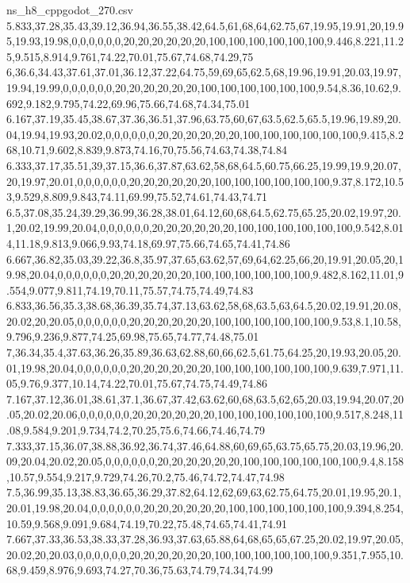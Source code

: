 \begin{filecontents*}[overwrite]{ns_h8_cppgodot_270.csv}
5.833,37.28,35.43,39.12,36.94,36.55,38.42,64.5,61,68,64,62.75,67,19.95,19.91,20,19.95,19.93,19.98,0,0,0,0,0,0,20,20,20,20,20,20,100,100,100,100,100,100,9.446,8.221,11.25,9.515,8.914,9.761,74.22,70.01,75.67,74.68,74.29,75
6,36.6,34.43,37.61,37.01,36.12,37.22,64.75,59,69,65,62.5,68,19.96,19.91,20.03,19.97,19.94,19.99,0,0,0,0,0,0,20,20,20,20,20,20,100,100,100,100,100,100,9.54,8.36,10.62,9.692,9.182,9.795,74.22,69.96,75.66,74.68,74.34,75.01
6.167,37.19,35.45,38.67,37.36,36.51,37.96,63.75,60,67,63.5,62.5,65.5,19.96,19.89,20.04,19.94,19.93,20.02,0,0,0,0,0,0,20,20,20,20,20,20,100,100,100,100,100,100,9.415,8.268,10.71,9.602,8.839,9.873,74.16,70,75.56,74.63,74.38,74.84
6.333,37.17,35.51,39,37.15,36.6,37.87,63.62,58,68,64.5,60.75,66.25,19.99,19.9,20.07,20,19.97,20.01,0,0,0,0,0,0,20,20,20,20,20,20,100,100,100,100,100,100,9.37,8.172,10.53,9.529,8.809,9.843,74.11,69.99,75.52,74.61,74.43,74.71
6.5,37.08,35.24,39.29,36.99,36.28,38.01,64.12,60,68,64.5,62.75,65.25,20.02,19.97,20.1,20.02,19.99,20.04,0,0,0,0,0,0,20,20,20,20,20,20,100,100,100,100,100,100,9.542,8.014,11.18,9.813,9.066,9.93,74.18,69.97,75.66,74.65,74.41,74.86
6.667,36.82,35.03,39.22,36.8,35.97,37.65,63.62,57,69,64,62.25,66,20,19.91,20.05,20,19.98,20.04,0,0,0,0,0,0,20,20,20,20,20,20,100,100,100,100,100,100,9.482,8.162,11.01,9.554,9.077,9.811,74.19,70.11,75.57,74.75,74.49,74.83
6.833,36.56,35.3,38.68,36.39,35.74,37.13,63.62,58,68,63.5,63,64.5,20.02,19.91,20.08,20.02,20,20.05,0,0,0,0,0,0,20,20,20,20,20,20,100,100,100,100,100,100,9.53,8.1,10.58,9.796,9.236,9.877,74.25,69.98,75.65,74.77,74.48,75.01
7,36.34,35.4,37.63,36.26,35.89,36.63,62.88,60,66,62.5,61.75,64.25,20,19.93,20.05,20.01,19.98,20.04,0,0,0,0,0,0,20,20,20,20,20,20,100,100,100,100,100,100,9.639,7.971,11.05,9.76,9.377,10.14,74.22,70.01,75.67,74.75,74.49,74.86
7.167,37.12,36.01,38.61,37.1,36.67,37.42,63.62,60,68,63.5,62,65,20.03,19.94,20.07,20.05,20.02,20.06,0,0,0,0,0,0,20,20,20,20,20,20,100,100,100,100,100,100,9.517,8.248,11.08,9.584,9.201,9.734,74.2,70.25,75.6,74.66,74.46,74.79
7.333,37.15,36.07,38.88,36.92,36.74,37.46,64.88,60,69,65,63.75,65.75,20.03,19.96,20.09,20.04,20.02,20.05,0,0,0,0,0,0,20,20,20,20,20,20,100,100,100,100,100,100,9.4,8.158,10.57,9.554,9.217,9.729,74.26,70.2,75.46,74.72,74.47,74.98
7.5,36.99,35.13,38.83,36.65,36.29,37.82,64.12,62,69,63,62.75,64.75,20.01,19.95,20.1,20.01,19.98,20.04,0,0,0,0,0,0,20,20,20,20,20,20,100,100,100,100,100,100,9.394,8.254,10.59,9.568,9.091,9.684,74.19,70.22,75.48,74.65,74.41,74.91
7.667,37.33,36.53,38.33,37.28,36.93,37.63,65.88,64,68,65,65,67.25,20.02,19.97,20.05,20.02,20,20.03,0,0,0,0,0,0,20,20,20,20,20,20,100,100,100,100,100,100,9.351,7.955,10.68,9.459,8.976,9.693,74.27,70.36,75.63,74.79,74.34,74.99

\end{filecontents*}
